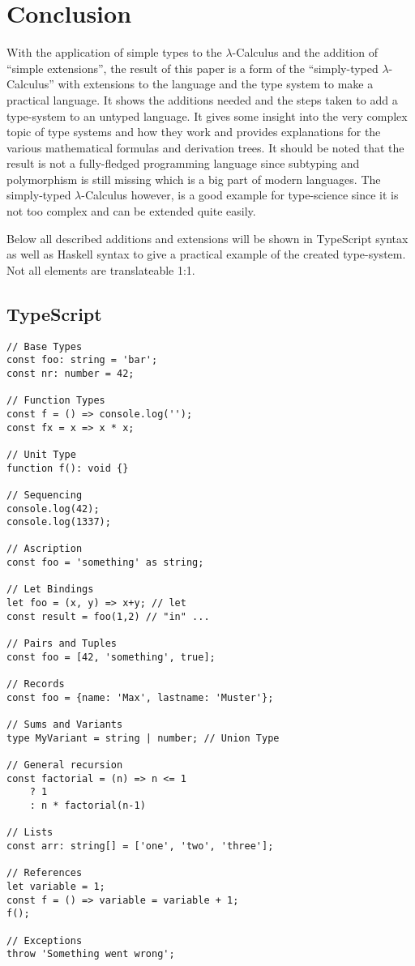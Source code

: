 \section{Conclusion}

With the application of simple types to the $\lambda$-Calculus
and the addition of ``simple extensions'', the result of this paper
is a form of the ``simply-typed $\lambda$-Calculus'' with extensions to
the language and the type system to make a practical language. It shows
the additions needed and the steps taken to add a type-system to an
untyped language. It gives some insight into the very complex topic
of type systems and how they work and provides explanations for the
various mathematical formulas and derivation trees. It should be
noted that the result is not a fully-fledged programming language since
subtyping and polymorphism is still missing which is a big part of
modern languages. The simply-typed $\lambda$-Calculus however, is
a good example for type-science since it is not too complex and
can be extended quite easily.

Below all described additions and extensions will be shown in
TypeScript syntax as well as Haskell syntax to give a practical
example of the created type-system. Not all elements are
translateable 1:1.

\subsection*{TypeScript}

\begin{verbatim}
// Base Types
const foo: string = 'bar';
const nr: number = 42;

// Function Types
const f = () => console.log('');
const fx = x => x * x;

// Unit Type
function f(): void {}

// Sequencing
console.log(42);
console.log(1337);

// Ascription
const foo = 'something' as string;

// Let Bindings
let foo = (x, y) => x+y; // let
const result = foo(1,2) // "in" ...

// Pairs and Tuples
const foo = [42, 'something', true];

// Records
const foo = {name: 'Max', lastname: 'Muster'};

// Sums and Variants
type MyVariant = string | number; // Union Type

// General recursion
const factorial = (n) => n <= 1
    ? 1
    : n * factorial(n-1)

// Lists
const arr: string[] = ['one', 'two', 'three'];

// References
let variable = 1;
const f = () => variable = variable + 1;
f();

// Exceptions
throw 'Something went wrong';
\end{verbatim}

